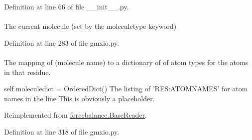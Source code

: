 \-Definition at line 66 of file \-\_\-\-\_\-init\-\_\-\-\_\-.\-py.

\hypertarget{classforcebalance_1_1gmxio_1_1ITP__Reader_a4bfd13e4b79e0d89f0263d1f2e566850}{
\paragraph[{mol}]{}}\label{classforcebalance_1_1gmxio_1_1ITP__Reader_a4bfd13e4b79e0d89f0263d1f2e566850}


\-The current molecule (set by the moleculetype keyword) 



\-Definition at line 283 of file gmxio.\-py.

\hypertarget{classforcebalance_1_1gmxio_1_1ITP__Reader_a5ed800499e9442adaea0cee243960f94}{
\paragraph[{molatom}]{}}\label{classforcebalance_1_1gmxio_1_1ITP__Reader_a5ed800499e9442adaea0cee243960f94}


\-The mapping of (molecule name) to a dictionary of of atom types for the atoms in that residue. 

self.\-moleculedict = \-Ordered\-Dict() \-The listing of '\-R\-E\-S\-:\-A\-T\-O\-M\-N\-A\-M\-E\-S' for atom names in the line \-This is obviously a placeholder. 

\-Reimplemented from \hyperlink{classforcebalance_1_1BaseReader_ab444c213e15929253dd73395ac5f19fc}{forcebalance.\-Base\-Reader}.



\-Definition at line 318 of file gmxio.\-py.

\hypertarget{classforcebalance_1_1BaseReader_a4369b5fb663a83b11602daa71db6862e}{
\paragraph[{\-Molecules}]{}}\label{classforcebalance_1_1BaseReader_a4369b5fb663a83b11602daa71db6862e}


